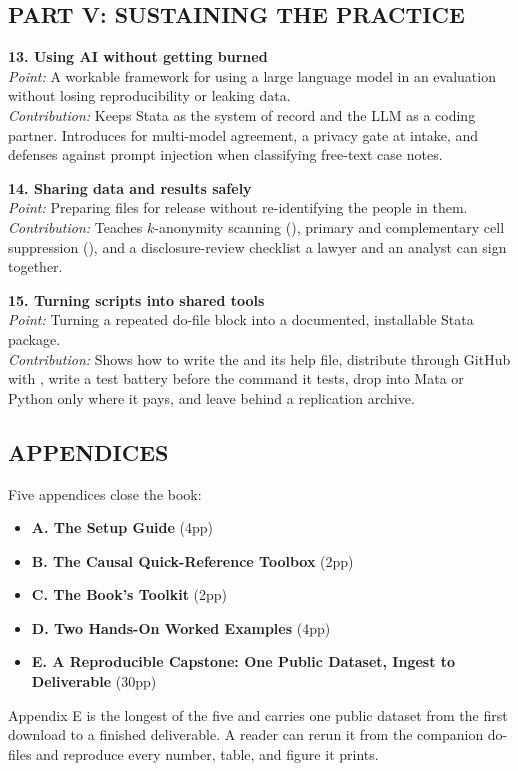 \documentclass[11pt]{article}
\begin{document}
\subsection*{PART V: SUSTAINING THE PRACTICE}
\textbf{13. Using AI without getting burned}\\
\textit{Point:} A workable framework for using a large language model in an evaluation without losing reproducibility or leaking data.\\
\textit{Contribution:} Keeps Stata as the system of record and the LLM as a coding partner. Introduces  for multi-model agreement, a privacy gate at intake, and defenses against prompt injection when classifying free-text case notes.

\textbf{14. Sharing data and results safely}\\
\textit{Point:} Preparing files for release without re-identifying the people in them.\\
\textit{Contribution:} Teaches $k$-anonymity scanning (), primary and complementary cell suppression (), and a disclosure-review checklist a lawyer and an analyst can sign together.

\textbf{15. Turning scripts into shared tools}\\
\textit{Point:} Turning a repeated do-file block into a documented, installable Stata package.\\
\textit{Contribution:} Shows how to write the  and its help file, distribute through GitHub with , write a test battery before the command it tests, drop into Mata or Python only where it pays, and leave behind a replication archive.

\subsection*{APPENDICES}
Five appendices close the book:
\begin{itemize}
    \item \textbf{A. The Setup Guide} (4pp)
    \item \textbf{B. The Causal Quick-Reference Toolbox} (2pp)
    \item \textbf{C. The Book's Toolkit} (2pp)
    \item \textbf{D. Two Hands-On Worked Examples} (4pp)
    \item \textbf{E. A Reproducible Capstone: One Public Dataset, Ingest to Deliverable} (30pp)
\end{itemize}
Appendix E is the longest of the five and carries one public dataset from the first download to a finished deliverable. A reader can rerun it from the companion do-files and reproduce every number, table, and figure it prints.
\end{document}
